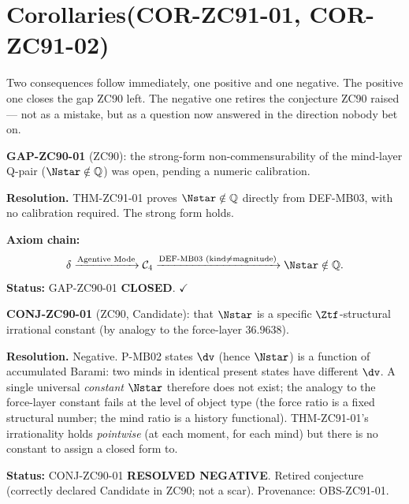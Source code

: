 \documentclass[12pt, a4paper]{article}
\begin{document}
\section{Corollaries\quad(COR-ZC91-01, COR-ZC91-02)}
\label{sec:cor-zc91}

Two consequences follow immediately, one positive and one negative. The
positive one closes the gap ZC90 left. The negative one retires the
conjecture ZC90 raised --- not as a mistake, but as a question now
answered in the direction nobody bet on.

\begin{formalbox}[title={COR-ZC91-01: GAP-ZC90-01 Closed ($R_0$, Exact)}]
\textbf{GAP-ZC90-01} (ZC90): the strong-form non-commensurability of the
mind-layer Q-pair ($\Nstar\notin\mathbb{Q}$) was open, pending a numeric
calibration.

\textbf{Resolution.} THM-ZC91-01 proves $\Nstar\notin\mathbb{Q}$ directly
from DEF-MB03, with no calibration required. The strong form holds.

\textbf{Axiom chain:}
\[
  \delta \xrightarrow{\text{Agentive Mode}} \mathcal{C}_4
  \xrightarrow{\text{DEF-MB03 (kind}\neq\text{magnitude)}}
  \Nstar\notin\mathbb{Q}.
\]
\textbf{Status:} GAP-ZC90-01 \textbf{CLOSED}. $\checkmark$
\end{formalbox}

\begin{formalbox}[title={COR-ZC91-02: CONJ-ZC90-01 Resolved Negative
  ($R_0$, Exact)}]
\textbf{CONJ-ZC90-01} (ZC90, Candidate): that $\Nstar$ is a specific
$\Ztf$-structural irrational constant (by analogy to the force-layer
$36.9638$).

\textbf{Resolution.} Negative. P-MB02 states $\dv$ (hence $\Nstar$) is a
function of accumulated Barami: two minds in identical present states have
different $\dv$. A single universal \emph{constant} $\Nstar$ therefore
does not exist; the analogy to the force-layer constant fails at the
level of object type (the force ratio is a fixed structural number; the
mind ratio is a history functional). THM-ZC91-01's irrationality holds
\emph{pointwise} (at each moment, for each mind) but there is no constant
to assign a closed form to.

\textbf{Status:} CONJ-ZC90-01 \textbf{RESOLVED NEGATIVE}. Retired
conjecture (correctly declared Candidate in ZC90; not a scar). Provenance:
OBS-ZC91-01.
\end{formalbox}
\end{document}
